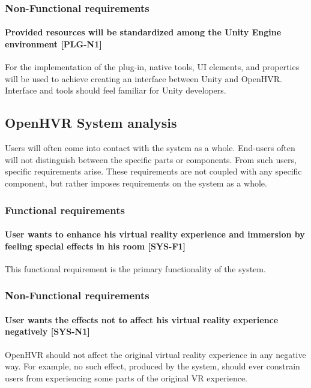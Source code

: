 \hypertarget{x-non-functional-requirements}{\subsubsection*{Non-Functional requirements}}
\hypertarget{x-\textbf{provided-resources-will-be-standardized-among-the-unity-engine-environment}-[plg-n1]}{\paragraph*{\textbf{Provided resources will be standardized among the Unity Engine environment} [PLG-N1]}}
For the implementation of the plug-in, native tools, UI elements, and properties
will be used to achieve creating an interface between Unity and OpenHVR.
Interface and tools should feel familiar for Unity developers.


\hypertarget{x-openhvr-system-analysis}{\subsection*{OpenHVR System analysis}}
Users will often come into contact with the system as a whole. End-users
often will not distinguish between the specific parts or components. From such
users, specific requirements arise. These requirements are not coupled with
any specific component, but rather imposes requirements on the system as a whole.


\hypertarget{x-functional-requirements}{\subsubsection*{Functional requirements}}
\hypertarget{x-\textbf{user-wants-to-enhance-his-virtual-reality-experience-and-immersion-by-feeling-special-effects-in-his-room}-[sys-f1]}{\paragraph*{\textbf{User wants to enhance his virtual reality experience and immersion by feeling special effects in his room} [SYS-F1]}}
This functional requirement is the primary functionality of the system.


\hypertarget{x-non-functional-requirements}{\subsubsection*{Non-Functional requirements}}
\hypertarget{x-\textbf{user-wants-the-effects-not-to-affect-his-virtual-reality-experience-negatively}-[sys-n1]}{\paragraph*{\textbf{User wants the effects not to affect his virtual reality experience negatively} [SYS-N1]}}
OpenHVR should not affect the original virtual reality experience in any
negative way. For example, no such effect, produced by the system, should ever
constrain users from experiencing some parts of the original VR experience.


